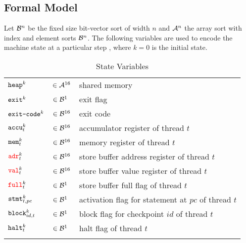 
\subsection*{Formal Model}

Let $\BVSORT[n]$ be the fixed size bit-vector sort of width $n$ and $\ASORT[n]$ the array sort with index and element sorts $\BVSORT[n]$.
The following variables are used to encode the machine state at a particular step , where $k = 0$ is the initial state.

\setlength{\tabulinesep}{3pt}
\begin{longtabu}{llX}
  \firsthline
  $\HEAP^k$ & $\in \ASORT$ & shared memory \\
  $\EXIT^k$ & $\in \BVSORT[1]$ & exit flag \\
  $\EXITCODE^k$ & $\in \BVSORT$ & exit code \\
  \hline
  $\ACCU^k_t$ & $\in \BVSORT$ & accumulator register of thread $t$ \\
  $\MEM^k_t$ & $\in \BVSORT$ &  memory register of thread $t$ \\
  $\SBADR^k_t$ & $\in \BVSORT$ & store buffer address register of thread $t$ \\
  $\SBVAL^k_t$ & $\in \BVSORT$ & store buffer value register of thread $t$ \\
  $\SBFULL^k_t$ & $\in \BVSORT[1]$ & store buffer full flag of thread $t$ \\
  $\STMT^k_{t, pc}$ & $\in \BVSORT[1]$ & activation flag for statement at $pc$ of thread $t$ \\
  $\BLOCK^k_{id, t}$ & $\in \BVSORT[1]$ & block flag for checkpoint $id$ of thread $t$ \\
  $\HALT^k_t$ & $\in \BVSORT[1]$ & halt flag of thread $t$ \\
  \lasthline
  \caption{State Variables}
  \label{tbl:states}
\end{longtabu}

\newpage

\newcommand{\READ}{\texttt{read}}
\newcommand{\WRITE}{\texttt{write}}

